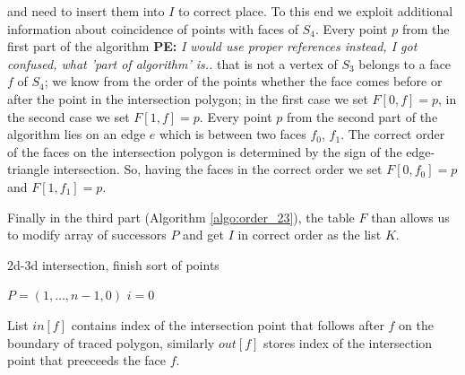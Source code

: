\documentclass{elsarticle}
\def\abs#1{\left|#1\right|}
\def\abs#1{| #1 |}
\newcommand{\notePE}[1]{{\color{Orange} \textbf{PE: } \textit{#1}}}
\begin{document}
and need to insert them into $I$ to correct place. To this end we exploit additional information about coincidence of points
with faces of $S_4$. Every point $p$ from the first part of the algorithm \notePE{I would use proper references instead, I got confused, what 'part of algorithm' is..} that is not a vertex of $S_3$ belongs to a face $f$ of $S_4$; we know from the order of the points
whether the face comes before or after the point in the intersection polygon; in the first case we set $F[0,f] =p$, in the second case we set $F[1,f]=p$. 
Every point $p$ from the second part of the algorithm lies on an edge $e$ which is between two faces $f_0$, $f_1$. The correct order of the faces on the 
intersection polygon is determined by the sign of the edge-triangle intersection. So, having the faces in the correct order we set $F[0,f_0]=p$ and $F[1, f_1]=p$.



Finally in the third part (Algorithm \ref{algo:order_23}), the table $F$ than allows us to modify array of successors $P$ and get $I$ in correct order as the list $K$.










\begin{algorithm}
  \caption{2d-3d intersection, finish sort of points}  
  \label{algo:order_23}
  
  \DontPrintSemicolon
  $P=(1,\dots, n-1,0)$
  $i=0$\;  
  \lFor{$n=0$ \To $\abs{I}-1$}{
    $K[n]=I[i]$
    $i=P[i]$
  }    
  \label{algo:order_23}
\end{algorithm}

  
 List $in[f]$ contains index of the intersection point that follows after $f$ on the boundary of traced polygon, 
 similarly $out[f]$ stores index of the intersection point that preeceeds the face $f$.
\end{document}
